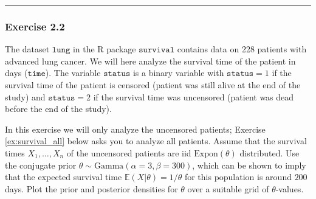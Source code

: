\documentclass[
  letterpaper,
  DIV=11,
  numbers=noendperiod]{scrartcl}
\begin{document}
\begin{center}\rule{0.5\linewidth}{0.5pt}\end{center}

\subsubsection{Exercise 2.2}\label{exercise-2.2}

The dataset \(\texttt{lung}\) in the R package \(\texttt{survival}\)
contains data on 228 patients with advanced lung cancer. We will here
analyze the survival time of the patient in days (\(\texttt{time}\)).
The variable \(\texttt{status}\) is a binary variable with
\(\texttt{status}=1\) if the survival time of the patient is censored
(patient was still alive at the end of the study) and
\(\texttt{status}=2\) if the survival time was uncensored (patient was
dead before the end of the study).

In this exercise we will only analyze the uncensored patients; Exercise
\ref{ex:survival_all} below asks you to analyze all patients. Assume
that the survival times \(X_1,\ldots,X_n\) of the uncensored patients
are iid \(\mathrm{Expon}(\theta)\) distributed. Use the conjugate prior
\(\theta \sim \mathrm{Gamma}(\alpha=3,\beta=300)\), which can be shown
to imply that the expected survival time
\(\mathbb{E}(X \vert \theta) = 1/\theta\) for this population is around
\(200\) days. Plot the prior and posterior densities for \(\theta\) over
a suitable grid of \(\theta\)-values.
\end{document}
